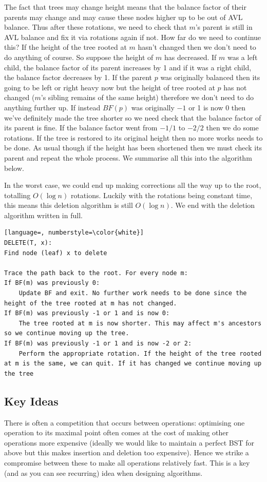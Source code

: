 The fact that trees may change height means that the balance factor of their parents may change and may cause these nodes higher up to be out of AVL balance. Thus after these rotations, we need to check that $m$'s parent is still in AVL balance and fix it via rotations again if not. How far do we need to continue this? If the height of the tree rooted at $m$ hasn't changed then we don't need to do anything of course. So suppose the height of $m$ has decreased. If $m$ was a left child, the balance factor of its parent increases by 1 and if it was a right child, the balance factor decreases by 1. If the parent $p$ was originally balanced then its going to be left or right heavy now but the height of tree rooted at $p$ has not changed ($m$'s sibling remains of the same height) therefore we don't need to do anything further up. If instead $BF(p)$ was originally $-1$ or 1 is now 0 then we've definitely made the tree shorter so we need check that the balance factor of its parent is fine. If the balance factor went from $-1/1$ to $-2/2$ then we do some rotations. If the tree is restored to its original height then no more works needs to be done. As usual though if the height has been shortened then we must check its parent and repeat the whole process. We summarise all this into the algorithm below.

In the worst case, we could end up making corrections all the way up to the root, totalling $O(\log n)$ rotations. Luckily with the rotations being constant time, this means this deletion algorithm is still $O(\log n)$. We end with the deletion algorithm written in full.

\begin{lstlisting}[language=, numberstyle=\color{white}]
DELETE(T, x):
Find node (leaf) x to delete

Trace the path back to the root. For every node m:
If BF(m) was previously 0:
    Update BF and exit. No further work needs to be done since the height of the tree rooted at m has not changed.
If BF(m) was previously -1 or 1 and is now 0:
    The tree rooted at m is now shorter. This may affect m's ancestors so we continue moving up the tree.
If BF(m) was previously -1 or 1 and is now -2 or 2:
    Perform the appropriate rotation. If the height of the tree rooted at m is the same, we can quit. If it has changed we continue moving up the tree
\end{lstlisting}

\subsection{Key Ideas}
There is often a competition that occurs between operations: optimising one operation to its maximal point often comes at the cost of making other operations more expensive (ideally we would like to maintain a perfect BST for above but this makes insertion and deletion too expensive). Hence we strike a compromise between these to make all operations relatively fast. This is a key (and as you can see recurring) idea when designing algorithms.

